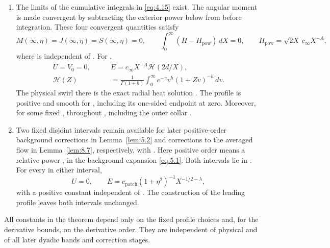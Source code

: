 \begin{theorem}
\begin{enumerate}[label=(\roman*)]
\item The limits  of the cumulative integrals in \eqref{eq:4.15} exist. The angular moment is made convergent by subtracting the exterior power  below from  before integration. These four convergent quantities satisfy
\begin{equation}
  M(\infty,\eta)=J(\infty,\eta)=S(\infty,\eta)=0,\qquad
  \int_0^\infty(H-H_{\mathrm{pow}})\,dX=0,\qquad
  H_{\mathrm{pow}}=\sqrt{2X}\,c_\infty X^{-A},
  \tag{4.28}\label{eq:4.28}
\end{equation}
where  is independent of . For ,
\begin{equation}
\begin{aligned}
  U=V_0=0,\qquad&E=c_\infty X^{-A}\mathcal{H}(2d/X),\\
  \mathcal{H}(Z)&=\frac{1}{\Gamma(1+h)}\int_0^\infty e^{-v}v^h(1+Zv)^{-h}\,dv.
\end{aligned}
\tag{4.29}\label{eq:4.29}
\end{equation}
The physical swirl there is the exact radial heat solution . The profile  is positive and smooth for , including its one-sided endpoint at zero. Moreover, for some fixed ,  throughout \NSi{NS-F-P033-059}{[X_v,\infty)}, including the outer collar .

\item Two fixed disjoint intervals  remain available for later positive-order background corrections in Lemma~\ref{lem:5.2} and corrections to the averaged flow in Lemma~\ref{lem:8.7}, respectively,
%
with . Here positive order means a relative power , in the background expansion \eqref{eq:5.1}. Both intervals lie in . For every  in either interval,
\begin{equation}
  U=0,\qquad E=c_{\mathrm{patch}}(1+\eta^2)^{-1}X^{-1/2-\lambda},
  \tag{4.30}\label{eq:4.30}
\end{equation}
with a positive constant  independent of . The construction of the leading profile leaves both intervals unchanged.
\end{enumerate}

All constants in the theorem depend only on the fixed profile choices and, for the derivative bounds, on the derivative order. They are independent of physical  and of all later dyadic bands and correction stages.
\end{theorem}

